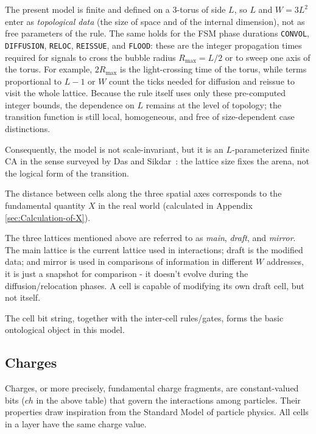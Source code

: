 \documentclass{ijuc}
\begin{document}
The present model is finite and defined on a $3$-torus of side $L$, so $L$ and $W=3L^{2}$ enter as \emph{topological data} (the size of space and of the internal dimension), not as free parameters of the rule. The same holds for the FSM phase durations \texttt{CONVOL}, \texttt{DIFFUSION}, \texttt{RELOC}, \texttt{REISSUE}, and \texttt{FLOOD}: these are the integer propagation times required for signals to cross the bubble radius $R_{\max}=L/2$ or to sweep one axis of the torus. For example, $2R_{\max}$ is the light-crossing time of the torus, while terms proportional to $L-1$ or $W$ count the ticks needed for diffusion and reissue to visit the whole lattice. Because the rule itself uses only these pre-computed integer bounds, the dependence on $L$ remains at the level of topology; the transition function is still local, homogeneous, and free of size-dependent case distinctions.

Consequently, the model is not scale-invariant, but it is an $L$-parameterized finite CA in the sense surveyed by Das and Sikdar~\cite{das2025nonuniform}: the lattice size fixes the arena, not the logical form of the transition.

The distance between cells along the three spatial axes corresponds to the fundamental quantity $X$ in the real world (calculated in Appendix \ref{sec:Calculation-of-X}).

The three lattices mentioned above are referred to as \textit{main}, \textit{draft}, and \textit{mirror}. 
The main lattice is the current lattice used in interactions; draft is the modified data; and mirror is used in comparisons of information in different $W  $ addresses, it is just a snapshot for comparison - it doesn't evolve during the diffusion/relocation phases. 
A cell is capable of modifying its own draft cell, but not itself.

The cell bit string, together with the inter-cell rules/gates, forms the basic ontological object in this model.

\subsection{Charges}
Charges, or more precisely, fundamental charge fragments, are constant-valued bits ($ch$ in the above table) that govern the interactions among particles. 
Their properties draw inspiration from the Standard Model of particle physics. 
All cells in a layer have the same charge value.
\end{document}
